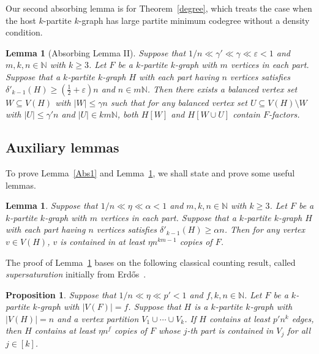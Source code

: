 \documentclass[11pt,a4paper]{article}
\newtheorem{prop}[thm]{Proposition}
\newtheorem{lemma}[thm]{Lemma}
\theoremstyle{definition}
\begin{document}
Our second absorbing lemma is for Theorem~\ref{degree}, which treats the case when the host $k$-partite $k$-graph has large partite minimum codegree without a density condition.

\begin{lemma}[Absorbing Lemma II]\label{Abs2}
Suppose that $1/n\ll \gamma '\ll \gamma \ll  \varepsilon <1$ and $m,k, n \in \mathbb{N}$ with $k\ge 3$.
Let $F$ be a $k$-partite $k$-graph with $m$ vertices in each part. Suppose that a $k$-partite $k$-graph $H$ with each part having $n$ vertices satisfies $\delta'_{k-1}(H)\geq (\frac{1}{2}+\varepsilon) n$ and $n\in m\mathbb{N}$.
Then there exists a balanced vertex set $W \subseteq V (H)$ with $|W| \leq \gamma n$ such that for any balanced vertex set $U\subseteq V(H)\setminus W$ with $|U|\leq \gamma' n$ and $|U|\in km\mathbb{N}$, both $H[W]$ and $H[W \cup U]$ contain $F$-factors.
\end{lemma}

\subsection{Auxiliary lemmas}
To prove Lemma~\ref{Abs1} and Lemma~\ref{Abs2}, we shall state and prove some useful lemmas.

\begin{lemma}\label{cover}
    Suppose that $1/n \ll \eta \ll \alpha <1$ and $m,k,n\in \mathbb{N}$ with $k\geq 3$. Let $F$ be a $k$-partite $k$-graph with $m$ vertices in each part. Suppose that a $k$-partite $k$-graph $H$ with each part having $n$ vertices satisfies $\delta'_{k-1}(H)\geq \alpha n$. Then for any vertex $v\in V(H)$, $v$ is contained in at least $\eta n^{km-1}$ copies of $F$.
\end{lemma}

The proof of Lemma~\ref{cover} bases on the following classical counting result, called {\emph{supersaturation}} initially from Erd\H{o}s~\cite{Erd}.

\begin{prop}\label{super}
     Suppose that $1/n\ll \eta \ll p'<1$ and $f,k,n\in \mathbb{N}$.  Let $F$ be a $k$-partite $k$-graph with $|V(F)|=f$. Suppose that $H$ is a $k$-partite $k$-graph with $|V(H)|=n$ and a vertex partition $V_1\cup \cdots \cup V_k$. If $H$ contains at least $p' n^k$ edges, then $H$ contains at least $\eta n^{f}$ copies of $F$ whose $j$-th part is contained in $V_{j}$ for all $j\in[k]$.
\end{prop}
\end{document}
